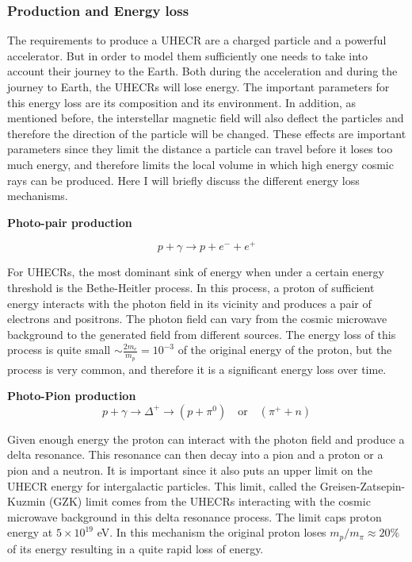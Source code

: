 \subsubsection{Production and Energy loss}
The requirements to produce a UHECR are a charged particle and a powerful accelerator. But in order to
model them sufficiently one needs to take into account their journey to the Earth. Both during the acceleration and during the journey to Earth, the UHECRs will lose energy. 
The important parameters for this energy loss are its composition and its environment. In addition, as mentioned before, the interstellar magnetic field will also deflect the particles and therefore the direction of the particle will be changed. 
These effects are important parameters since they limit the 
distance a particle can travel before it loses too much energy, and therefore limits the local volume in which high energy cosmic rays can be produced. 
Here I will briefly discuss the different energy loss mechanisms.

\textbf{Photo-pair production}

\begin{equation}
    p + \gamma \rightarrow p + e^- + e^+
\end{equation}

For UHECRs, the most dominant sink of energy when under a certain energy threshold is the Bethe-Heitler process. In this process, a proton of sufficient energy interacts with the 
photon field in its vicinity and produces a pair of electrons and positrons. The photon field can vary from the cosmic microwave background to the generated field from different sources. 
The energy loss of this process is quite small $\sim \frac{2m_e}{m_p}= 10^{-3}$ of the original energy of the proton, but the process is very common, and therefore it is a significant energy loss over time.


\textbf{Photo-Pion production }
\begin{equation}
    p + \gamma \rightarrow \Delta^+ \rightarrow (p + \pi^0)\quad \text{or} \quad (\pi^+ + n)
    \label{eq:delta_resonance}
\end{equation}

Given enough energy the proton can interact with the photon field and produce a delta resonance. This resonance can then decay into a pion and a proton or a pion and a neutron. 
It is important since it also puts an upper limit on the UHECR energy for intergalactic particles. 
This limit, called the Greisen-Zatsepin-Kuzmin (GZK) limit comes from the UHECRs interacting with the cosmic microwave background in this delta resonance process. The limit caps proton energy at $5\times 10^{19}$ eV.
In this mechanism the original proton loses $m_p/m_\pi \approx 20\% $ of its energy resulting in a quite rapid loss of energy.

